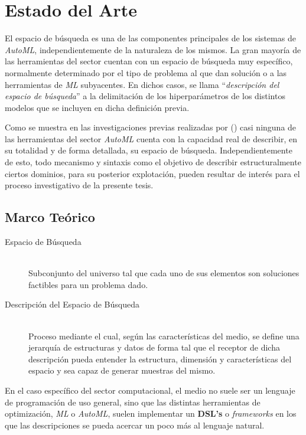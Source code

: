 \chapter{Estado del Arte}\label{chapter:state-of-the-art}


El espacio de búsqueda es una de las componentes principales de los sistemas
de {\it AutoML}, independientemente de la naturaleza de los mismos. La gran mayoría
de las herramientas del sector cuentan con un espacio de búsqueda muy específico,
normalmente determinado por el tipo de problema al que dan solución o a las
herramientas de {\it ML} subyacentes. En dichos casos, se llama ``{\it descripción
del espacio de búsqueda}'' a la delimitación de los hiperparámetros de los
distintos modelos que se incluyen en dicha definición previa.

Como se muestra en las investigaciones previas realizadas por (\cite{estevanellhacia}) casi ninguna
de las herramientas del sector {\it AutoML} cuenta con la capacidad real de describir,
en su totalidad y de forma detallada, su espacio de búsqueda. Independientemente
de esto, todo mecanismo y sintaxis como el objetivo de describir estructuralmente
ciertos dominios, para su posterior explotación, pueden resultar de interés para
el proceso investigativo de la presente tesis.

\section{Marco Teórico}

\begin{description}
      \item[Espacio de Búsqueda] \hfill \\ 
            Subconjunto del universo tal que cada uno de sus elementos son soluciones factibles
      para un problema dado.
      \item[Descripción del Espacio de Búsqueda]  \hfill \\ 
            Proceso mediante el cual, según las características del medio, se define una
      jerarquía de estructuras y datos de forma tal que el receptor de dicha descripción
      pueda entender la estructura, dimensión y características del espacio y sea capaz
      de generar muestras del mismo.


\end{description}

En el caso específico del sector computacional, el medio no suele ser un lenguaje
de programación de uso general, sino que las distintas herramientas de optimización,
{\it ML} o {\it AutoML}, suelen implementar un {\bf DSL's} o {\it frameworks} en los
que las descripciones se pueda acercar un poco más al lenguaje natural.

